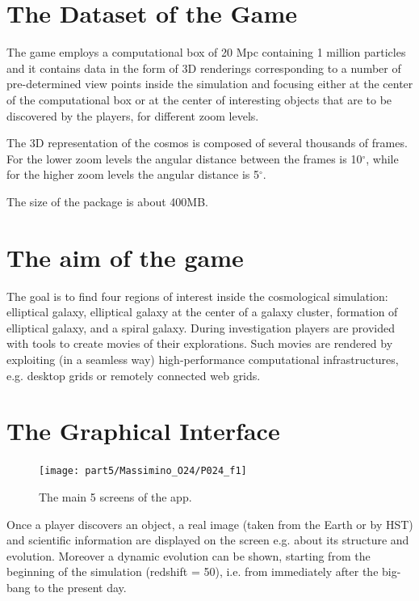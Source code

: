\section{The Dataset of the Game}
The game employs a computational box of 20 Mpc containing 1 million particles and it contains data in the form of 3D renderings corresponding to a number of pre-determined view points inside the simulation and focusing either at the center of the computational box or at the center of interesting objects that are to be discovered by the players, for different zoom levels. 

The 3D representation of the cosmos is composed of several thousands of frames. For the lower zoom levels the angular distance  between the frames is 10$^\circ$, while for the higher zoom levels the angular distance is 5$^\circ$.

The size of the package is about 400MB.

\section{The aim of the game}
The goal is to find four regions of interest inside the cosmological simulation:  elliptical galaxy, elliptical galaxy at the center of a galaxy cluster, formation of elliptical galaxy, and a spiral galaxy. During investigation players are provided with tools to create movies of their explorations. Such movies are rendered by exploiting (in a seamless way) high-performance computational infrastructures, e.g. desktop grids or remotely connected web grids.

\section{The Graphical Interface}

\begin{figure}[h!]
\centering
\texttt{[image: part5/Massimino\_O24/P024\_f1]}
\caption{The main 5 screens of the app.}
\end{figure}
Once a player discovers an object, a real image (taken from the Earth or by HST) and scientific information are displayed on the screen e.g. about its structure and evolution. Moreover a dynamic evolution can be shown, starting from the beginning of the simulation (redshift = 50), i.e. from immediately after the big-bang to the present day.

